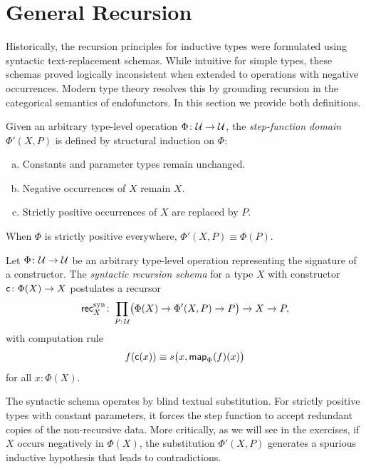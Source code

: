 \section{General Recursion}

Historically, the recursion principles for inductive types were formulated using syntactic text-replacement schemas. While intuitive for simple types, these schemas proved logically inconsistent when extended to operations with negative occurrences. Modern type theory resolves this by grounding recursion in the categorical semantics of endofunctors. In this section we provide both definitions.

\begin{defn}\label{defn:mixed-variance-domain}
    Given an arbitrary type-level operation $\Phi\colon\univ\to\univ$, the \textsl{step-function domain} $\Phi'(X,P)$ is defined by structural induction on $\Phi$:
    \begin{enumerate}[a),font=\upshape]
        \item Constants and parameter types remain unchanged.
        \item Negative occurrences of $X$ remain $X$.
        \item Strictly positive occurrences of $X$ are replaced by $P$.
    \end{enumerate}
    When $\Phi$ is strictly positive everywhere, $\Phi'(X,P)\equiv\Phi(P)$.
\end{defn}

\begin{defn}\label{defn:syntactic-recursion}
    Let $\Phi\colon\univ\to\univ$ be an arbitrary type-level operation representing the signature of a constructor. The \textsl{syntactic recursion schema} for a type $X$ with constructor $\fun c\colon\Phi(X)\to X$ postulates a recursor
    \[
        \fun{rec}^{\text{syn}}_X\colon
            \prod_{P\colon\univ}
                \bigl(
                    \Phi(X)\to\Phi'(X,P)\to P
                \bigr)
                \to X\to P,
    \]
    with computation rule
    \begin{equation}\label{eq:syntactic-computation-rule}
        f(\mathsf{c}(x))\equiv s
            \bigl(
                x,
                \mathsf{map}_\Phi(f)(x)
            \bigr)
    \end{equation}
    for all $x\colon\Phi(X)$.
\end{defn}

\begin{rem}
    The syntactic schema operates by blind textual substitution. For strictly positive types with constant parameters, it forces the step function to accept redundant copies of the non-recursive data. More critically, as we will see in the exercises, if $X$ occurs negatively in $\Phi(X)$, the substitution $\Phi'(X,P)$ generates a spurious inductive hypothesis that leads to contradictions.
\end{rem}

